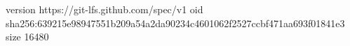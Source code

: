 version https://git-lfs.github.com/spec/v1
oid sha256:639215e98947551b209a54a2da90234c4601062f2527ccbf471aa693f01841e3
size 16480
